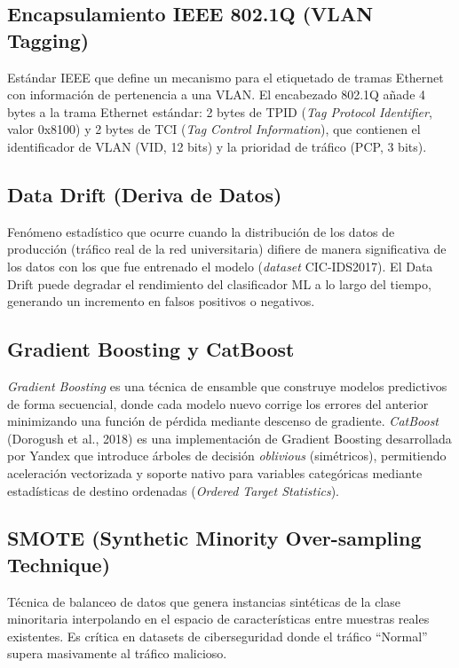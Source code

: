 \documentclass[12pt, letterpaper, oneside]{report}
\begin{document}
\subsection{Encapsulamiento IEEE 802.1Q (VLAN Tagging)}
Estándar IEEE que define un mecanismo para el etiquetado de tramas Ethernet con información de pertenencia a una VLAN. El encabezado 802.1Q añade 4 bytes a la trama Ethernet estándar: 2 bytes de TPID (\textit{Tag Protocol Identifier}, valor 0x8100) y 2 bytes de TCI (\textit{Tag Control Information}), que contienen el identificador de VLAN (VID, 12 bits) y la prioridad de tráfico (PCP, 3 bits).

\subsection{Data Drift (Deriva de Datos)}
Fenómeno estadístico que ocurre cuando la distribución de los datos de producción (tráfico real de la red universitaria) difiere de manera significativa de los datos con los que fue entrenado el modelo (\textit{dataset} CIC-IDS2017). El Data Drift puede degradar el rendimiento del clasificador ML a lo largo del tiempo, generando un incremento en falsos positivos o negativos.

\subsection{Gradient Boosting y CatBoost}
\textit{Gradient Boosting} es una técnica de ensamble que construye modelos predictivos de forma secuencial, donde cada modelo nuevo corrige los errores del anterior minimizando una función de pérdida mediante descenso de gradiente. \textit{CatBoost} (Dorogush et al., 2018) es una implementación de Gradient Boosting desarrollada por Yandex que introduce árboles de decisión \textit{oblivious} (simétricos), permitiendo aceleración vectorizada y soporte nativo para variables categóricas mediante estadísticas de destino ordenadas (\textit{Ordered Target Statistics}).

\subsection{SMOTE (Synthetic Minority Over-sampling Technique)}
Técnica de balanceo de datos que genera instancias sintéticas de la clase minoritaria interpolando en el espacio de características entre muestras reales existentes. Es crítica en datasets de ciberseguridad donde el tráfico ``Normal'' supera masivamente al tráfico malicioso.
\end{document}
